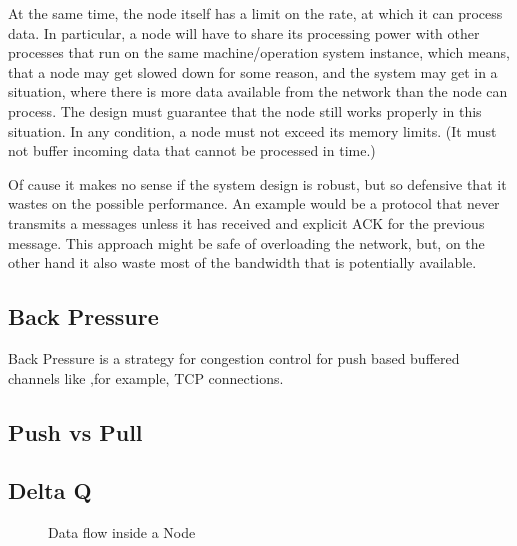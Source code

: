 \documentclass{report}
\newcommand{\wip}[1]{\color{magenta}{#1}\color{black}}
\theoremstyle{definition}{
  \newtheorem{lemma}{Lemma}[section] %
  \newtheorem{definition}[lemma]{Definition}
}
\theoremstyle{theorem}{
  \newtheorem{invariant}[lemma]{Invariant}
  \newtheorem{proofobligation}[lemma]{Proof Obligation}
}
\numberwithin{equation}{lemma}
\begin{document}
At the same time, the node itself has a limit on the rate, at which it can process data.
In particular, a node will have to share its processing power with other processes that run on the
same machine/operation system instance, which means, that a node may get slowed down for some reason,
and the system may get in a situation,
where there is more data available from the network than the node can process.
The design must guarantee that the node still works properly in this situation.
In any condition, a node must not exceed its memory limits.
(It must not buffer incoming data that cannot be processed in time.)

Of cause it makes no sense if the system design is robust, but so defensive that it wastes on the possible
performance.
An example would be a protocol that never transmits a messages unless it has received and
explicit ACK for the previous message. This approach might be safe of overloading the network, but,
on the other hand it also waste most of the bandwidth that is potentially available.

\subsection{Back Pressure}
Back Pressure is a strategy for congestion control for push based buffered channels like
,for example, TCP connections.



\wip{TODO: explain the concept of Back pressure and how it is used in the design}
\subsection{Push vs Pull}
\wip{TODO: data flow inside the node is pull based}
\subsection{Delta Q}
\wip{TODO: explain what delta Q means and what it has to do with congestion control.}

\begin{figure}[h]
  \begin{center}
  \end{center}
  \caption{Data flow inside a Node}
  \label{node-diagram-concurrency}
\end{figure}
\end{document}
